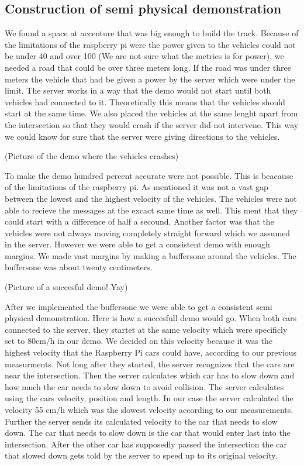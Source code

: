 \subsection{Construction of semi physical demonstration}

We found a space at accenture that was big enough to build the track. Because of the limitations of the raspberry pi were the power given to the vehicles could not be under 40 and over 100 (We are not sure what the metrics is for power), we needed a road that could be over three meters long. If the road was under three meters the vehicle that had be given a power by the server which were under the limit. The server works in a way that the demo would not start until both vehicles had connected to it. Theoretically this means that the vehicles should start at the same time. We also placed the vehicles at the same lenght apart from the intersection so that they would crash if the server did not intervene. This way we could know for sure that the server were giving directions to the vehicles. 

(Picture of the demo where the vehicles crashes)

To make the demo hundred percent accurate were not possible. This is beacause of the limitations of the raspberry pi. As mentioned it was not a vast gap between the lowest and the highest velocity of the vehicles. The vehicles were not able to recieve the messages at the excact same time as well. This ment that they could start with a difference of half a secound. Another factor was that the vehicles were not always moving completely straight forward which we assumed in the server. However we were able to get a consistent demo with enough margins. We made  vast margins by making a buffersone around the vehicles. The buffersone was about twenty centimeters.

(Picture of a succesful demo! Yay)

After we implemented the buffersone we were able to get a consistent semi physical demonstration. Here is how a succesfull demo would go. When both cars connected to the server, they startet at the same velocity which were specificly set to 80cm/h in our demo. We decided on this velocity because it was the highest velocity that the Raspberry Pi cars could have, according to our previous measurments. Not long after they started, the server recognizes that the cars are near the intersection. Then the server calculates which car has to slow down and how much the car needs to slow down to avoid collision. The server calculates using the cars velocity, position and length. In our case the server calculated the velocity 55 cm/h which was the slowest velocity according to our measurements. Further the server sends its calculated velocity to the car that needs to slow down. The car that needs to slow down is the car that would enter last into the intersection. After the other car has supposedly passed the intersection the car that slowed down gets told by the server to speed up to its original velocity.  